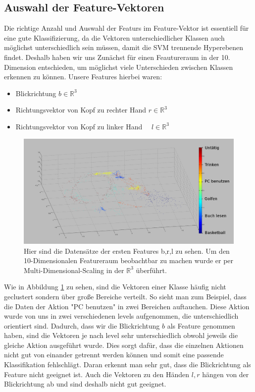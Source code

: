\subsection{Auswahl der Feature-Vektoren}
\label{subsec:auswahl-der-feature-vektoren}
Die richtige Anzahl und Auswahl der Featurs im Feature-Vektor ist essentiell für eine gute Klassifizierung, da die Vektoren unterschiedlicher Klassen auch möglichst unterschiedlich sein müssen, damit die SVM trennende Hyperebenen findet. Deshalb haben wir uns Zunächst für einen Feautureraum in der 10. Dimension entschieden, um möglichst viele Unterschieden zwischen Klassen erkennen zu können. Unsere Features hierbei waren:
\begin{itemize}
    \item Blickrichtung \qquad\qquad\qquad\qquad\qquad\qquad\qquad$b \in \mathbb{R}^3$
    \item Richtungsvektor von Kopf zu rechter Hand \quad $r \in \mathbb{R}^3$    
    \item Richtungsvektor von Kopf zu linker Hand \ \ \quad $l \in \mathbb{R}^3$
\end{itemize}
\begin{figure}[hbtp]
\includegraphics[width=1.0\linewidth]{OldFeatures.png}
\caption{Hier sind die Datensätze der ersten Features b,r,l zu sehen. Um den 10-Dimensionalen Featureraum beobachtbar zu machen wurde er per Multi-Dimensional-Scaling in der $\mathbb{R}^3$ überführt.}
\label{fig:Old-Features}
\end{figure}
Wie in Abbildung \ref{fig:Old-Features} zu sehen, sind die Vektoren einer Klasse häufig nicht geclustert sondern über große Bereiche verteilt. So sieht man zum Beispiel, dass die Daten der Aktion "PC benutzen" in zwei Bereichen auftauchen. Diese Aktion wurde von uns in zwei verschiedenen levels aufgenommen, die unterschiedlich orientiert sind. Dadurch, dass wir die Blickrichtung $b$ als Feature genommen haben, sind die Vektoren je nach level sehr unterschiedlich obwohl jeweils die gleiche Aktion ausgeführt wurde. Dies sorgt dafür, dass die einzelnen Aktionen nicht gut von einander getrennt werden können und somit eine passende Klassifikation fehlschlägt. Daran erkennt man sehr gut, dass die Blickrichtung als Feature nicht geeignet ist. Auch die Vektoren zu den Händen $l,r$ hängen von der Blickrichtung ab und sind deshalb nicht gut geeignet.\\
